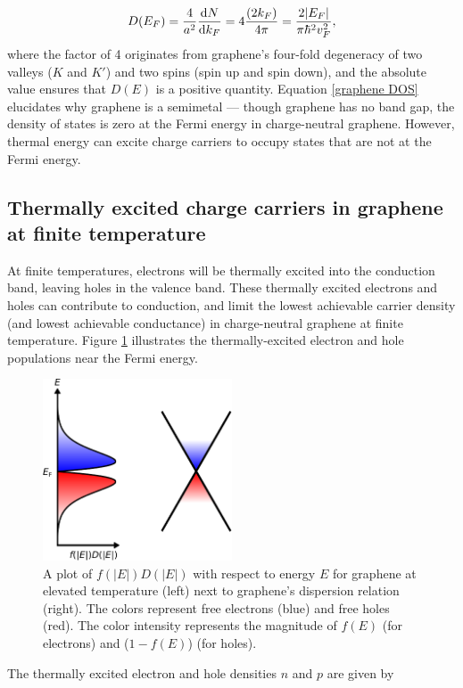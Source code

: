 \documentclass{beavtex_dub_edit}
\begin{document}
\begin{equation}
    D(E_F) = \frac{4}{a^2} \derivative{N}{k_F} = 4\frac{(2k_F)}{4 \pi} = \frac{2\abs{E_F}}{\pi \hbar^2 v_F^2}, \label{graphene DOS}
\end{equation}
where the factor of 4 originates from graphene's four-fold degeneracy of two valleys ($K$ and $K'$) and two spins (spin up and spin down), and the absolute value ensures that $D(E)$ is a positive quantity. Equation \ref{graphene DOS} elucidates why graphene is a semimetal — though graphene has no band gap, the density of states is zero at the Fermi energy in charge-neutral graphene. However, thermal energy can excite charge carriers to occupy states that are not at the Fermi energy.

\subsection{Thermally excited charge carriers in graphene at finite temperature}
At finite temperatures, electrons will be thermally excited into the conduction band, leaving holes in the valence band. These thermally excited electrons and holes can contribute to conduction, and limit the lowest achievable carrier density (and lowest achievable conductance) in charge-neutral graphene at finite temperature. Figure \ref{graphene at elevated T plot} illustrates the thermally-excited electron and hole populations near the Fermi energy. 
\begin{figure}
    \includegraphics[width = 0.5\textwidth]{graphene theory 3.pdf}
    \caption[A plot of $f(|E|)D(|E|)$ with respect to energy $E$ for graphene at elevated temperature (left) next to graphene's dispersion relation (right).]{A plot of $f(|E|)D(|E|)$ with respect to energy $E$ for graphene at elevated temperature (left) next to graphene's dispersion relation (right). The colors represent free electrons (blue) and free holes (red). The color intensity represents the magnitude of $f(E)$ (for electrons) and ($1-f(E)$) (for holes).}
    \label{graphene at elevated T plot}
\end{figure}
The thermally excited electron and hole densities $n$ and $p$ are given by
\end{document}
